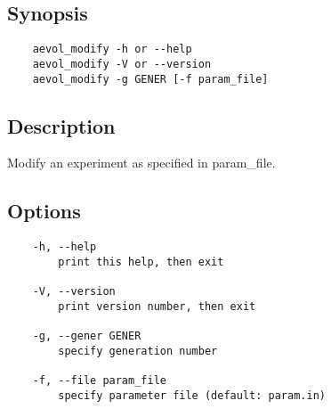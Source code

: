 \subsection*{Synopsis}
\begin{verbatim}
    aevol_modify -h or --help
    aevol_modify -V or --version
    aevol_modify -g GENER [-f param_file]
\end{verbatim}

\subsection*{Description}
Modify an experiment as specified in param\_file.

\subsection*{Options}
\begin{verbatim}
	-h, --help
	    print this help, then exit

	-V, --version
	    print version number, then exit

	-g, --gener GENER
	    specify generation number

	-f, --file param_file
	    specify parameter file (default: param.in)
\end{verbatim}


\clearemptydoublepage